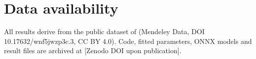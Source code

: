 \section*{Data availability}
All results derive from the public dataset of \cite{dataset} (Mendeley Data, DOI 10.17632/wnf5jwzp3c.3, CC BY 4.0).
Code, fitted parameters, ONNX models and result files are archived at [Zenodo DOI upon publication].
